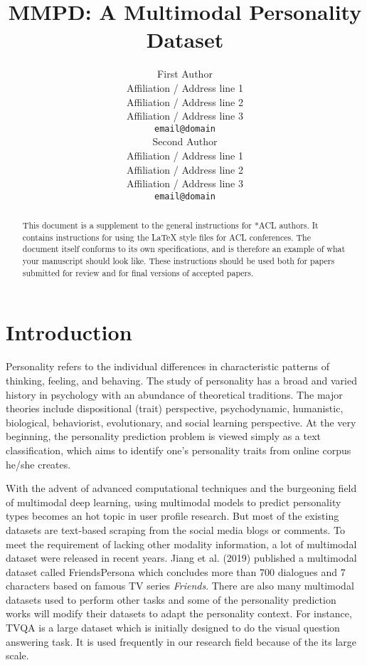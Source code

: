 \documentclass[11pt]{article}
\title{MMPD: A Multimodal Personality Dataset}
\author{First Author \\
  Affiliation / Address line 1 \\
  Affiliation / Address line 2 \\
  Affiliation / Address line 3 \\
  \texttt{email@domain} \\\And
  Second Author \\
  Affiliation / Address line 1 \\
  Affiliation / Address line 2 \\
  Affiliation / Address line 3 \\
  \texttt{email@domain} \\}
\begin{document}
\maketitle
\begin{abstract}
This document is a supplement to the general instructions for *ACL authors. It contains instructions for using the \LaTeX{} style files for ACL conferences. 
The document itself conforms to its own specifications, and is therefore an example of what your manuscript should look like.
These instructions should be used both for papers submitted for review and for final versions of accepted papers.
\end{abstract}

\section{Introduction}

Personality refers to the individual differences in characteristic patterns of thinking, feeling, and behaving. The study of personality has a broad and varied history in psychology with an abundance of theoretical traditions. The major theories include dispositional (trait) perspective, psychodynamic, humanistic, biological, behaviorist, evolutionary, and social learning perspective. At the very beginning, the personality prediction problem is viewed simply as a text classification, which aims to identify one's personality traits from online corpus he/she creates.

With the advent of advanced computational techniques and the burgeoning field of multimodal deep learning, using multimodal models to predict personality types becomes an hot topic in user profile research. But most of the existing datasets are text-based scraping from the social media blogs or comments. To meet the requirement of lacking other modality information, a lot of multimodal dataset were released in recent years. Jiang et al. (2019) published a multimodal dataset called FriendsPersona which concludes more than 700 dialogues and 7 characters based on famous TV series \textit{Friends}. There are also many multimodal datasets used to perform other tasks and some of the personality prediction works will modify their datasets to adapt the personality context. For instance, TVQA is a large dataset which is initially designed to do the visual question answering task. It is used frequently in our research field because of the its large scale.
\end{document}
